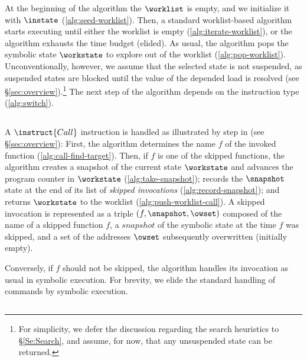 At the beginning of the algorithm the $\worklist$ is empty, and we
initialize it with $\instate$ (\cref{alg:seed-worklist}). Then, a
standard worklist-based algorithm starts executing until either the
worklist is empty (\cref{alg:iterate-worklist}), or the algorithm
exhausts the time budget (elided). As usual, the algorithm pops the
symbolic state $\workstate$ to explore out of the worklist
(\cref{alg:pop-worklist}). Unconventionally, however, we assume that
the selected state is not suspended, as suspended states are blocked
until the value of the depended load is resolved (see
\S\ref{sec:overview}).\footnote{For simplicity, we defer the
  discussion regarding the search heuristics to \S\ref{Se:Search}, and
  assume, for now, that any unsuspended state can be returned.}  The
next step of the algorithm depends on the instruction type
(\cref{alg:switch}).

\subsection{}

A $\instruct{Call}$ instruction is handled as illustrated by step
 in  (see \S\ref{sec:overview}): First, the
algorithm determines the name $f$ of the invoked function
(\cref{alg:call-find-target}). Then, if $f$ is one of the skipped
functions, the algorithm creates a snapshot of the current state
$\workstate$ and advances the program counter in $\workstate$
(\cref{alg:take-snapshot}); records the $\snapshot$ state at the end
of its list of \emph{skipped invocations}
(\cref{alg:record-snapshot}); and returns $\workstate$ to the worklist
(\cref{alg:push-worklist-call}). A skipped invocation is represented
as a triple $(f,\snapshot,\owset)$ composed of the name of a skipped
function $f$, a $snapshot$ of the symbolic state at the time $f$ was
skipped, and a set of the addresses $\owset$ subsequently overwritten
(initially empty).

Conversely, if $f$ should not be skipped, the algorithm handles its
invocation as usual in symbolic execution.  For brevity, we elide the
standard handling of commands by symbolic execution.

\subsection{}

